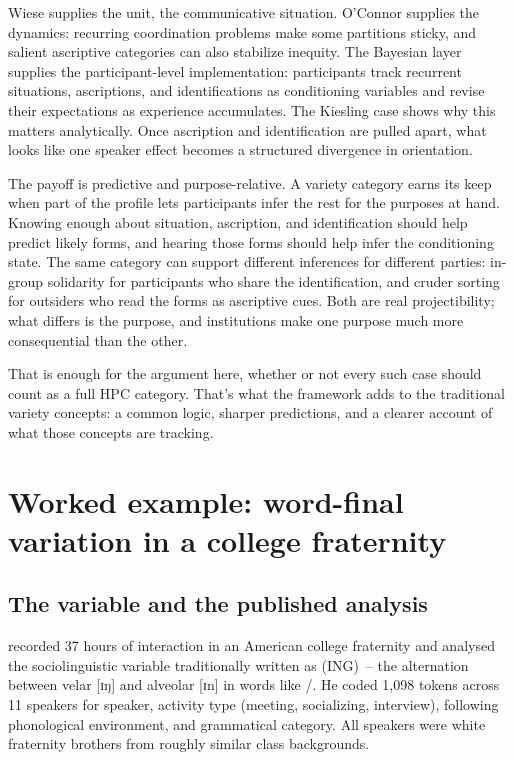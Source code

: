 \documentclass[11pt,letterpaper]{article}
\begin{document}
Wiese supplies the unit, the communicative situation. O'Connor supplies the dynamics: recurring coordination problems make some partitions sticky, and salient ascriptive categories can also stabilize inequity. The Bayesian layer supplies the participant-level implementation: participants track recurrent situations, ascriptions, and identifications as conditioning variables and revise their expectations as experience accumulates. The Kiesling case shows why this matters analytically. Once ascription and identification are pulled apart, what looks like one speaker effect becomes a structured divergence in orientation.

The payoff is predictive and purpose-relative. A variety category earns its keep when part of the profile lets participants infer the rest for the purposes at hand. Knowing enough about situation, ascription, and identification should help predict likely forms, and hearing those forms should help infer the conditioning state. The same category can support different inferences for different parties: in-group solidarity for participants who share the identification, and cruder sorting for outsiders who read the forms as ascriptive cues. Both are real projectibility; what differs is the purpose, and institutions make one purpose much more consequential than the other.

That is enough for the argument here, whether or not every such case should count as a full HPC category. That's what the framework adds to the traditional variety concepts: a common logic, sharper predictions, and a clearer account of what those concepts are tracking.

\clearpage
\appendix
\section{Worked example: word-final  variation in a college fraternity}
\label{app:kiesling}

\subsection{The variable and the published analysis}

\textcite{kiesling1998} recorded 37 hours of interaction in an American college fraternity and analysed the sociolinguistic variable traditionally written as (ING)~-- the alternation between velar [ɪŋ] and alveolar [ɪn] in words like /. He coded 1,098 tokens across 11 speakers for speaker, activity type (meeting, socializing, interview), following phonological environment, and grammatical category. All speakers were white fraternity brothers from roughly similar class backgrounds.
\end{document}
